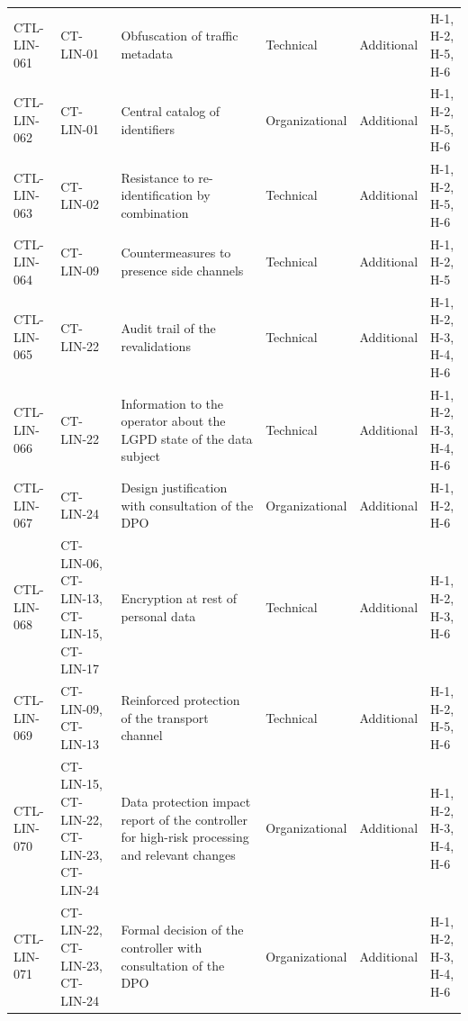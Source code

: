 \begin{footnotesize}
\begin{longtable}{l p{} p{} p{} p{} p{}}
        CTL-LIN-061 & CT-LIN-01 & Obfuscation of traffic metadata & Technical & Additional & H-1, H-2, H-5, H-6 \\
        CTL-LIN-062 & CT-LIN-01 & Central catalog of identifiers & Organizational & Additional & H-1, H-2, H-5, H-6 \\
        CTL-LIN-063 & CT-LIN-02 & Resistance to re-identification by combination & Technical & Additional & H-1, H-2, H-5, H-6 \\
        CTL-LIN-064 & CT-LIN-09 & Countermeasures to presence side channels & Technical & Additional & H-1, H-2, H-5 \\
        CTL-LIN-065 & CT-LIN-22 & Audit trail of the revalidations & Technical & Additional & H-1, H-2, H-3, H-4, H-6 \\
        CTL-LIN-066 & CT-LIN-22 & Information to the operator about the LGPD state of the data subject & Technical & Additional & H-1, H-2, H-3, H-4, H-6 \\
        CTL-LIN-067 & CT-LIN-24 & Design justification with consultation of the DPO & Organizational & Additional & H-1, H-2, H-6 \\
        CTL-LIN-068 & CT-LIN-06, CT-LIN-13, CT-LIN-15, CT-LIN-17 & Encryption at rest of personal data & Technical & Additional & H-1, H-2, H-3, H-6 \\
        CTL-LIN-069 & CT-LIN-09, CT-LIN-13 & Reinforced protection of the transport channel & Technical & Additional & H-1, H-2, H-5, H-6 \\
        CTL-LIN-070 & CT-LIN-15, CT-LIN-22, CT-LIN-23, CT-LIN-24 & Data protection impact report of the controller for high-risk processing and relevant changes & Organizational & Additional & H-1, H-2, H-3, H-4, H-6 \\
        CTL-LIN-071 & CT-LIN-22, CT-LIN-23, CT-LIN-24 & Formal decision of the controller with consultation of the DPO & Organizational & Additional & H-1, H-2, H-3, H-4, H-6 \\
\end{longtable}
\end{footnotesize}
